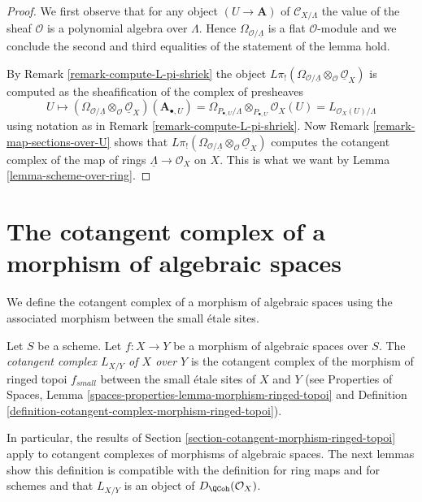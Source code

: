 \begin{proof}
We first observe that for any object $(U \to \mathbf{A})$ of
$\mathcal{C}_{X/\Lambda}$
the value of the sheaf $\mathcal{O}$ is a polynomial algebra over $\Lambda$.
Hence $\Omega_{\mathcal{O}/\underline{\Lambda}}$ is a flat $\mathcal{O}$-module
and we conclude the second and third equalities of the statement of the
lemma hold.

\medskip\noindent
By Remark \ref{remark-compute-L-pi-shriek} the object
$L\pi_!(\Omega_{\mathcal{O}/\underline{\Lambda}}
\otimes_\mathcal{O} \underline{\mathcal{O}}_X)$
is computed as the sheafification of the complex of presheaves
$$
U \mapsto
\left(\Omega_{\mathcal{O}/\underline{\Lambda}}
\otimes_\mathcal{O} \underline{\mathcal{O}}_X\right)(\mathbf{A}_{\bullet, U})
=
\Omega_{P_{\bullet, U}/\Lambda} \otimes_{P_{\bullet, U}} \mathcal{O}_X(U) =
L_{\mathcal{O}_X(U)/\Lambda}
$$
using notation as in Remark \ref{remark-compute-L-pi-shriek}.
Now Remark \ref{remark-map-sections-over-U} shows that
$L\pi_!(\Omega_{\mathcal{O}/\underline{\Lambda}}
\otimes_\mathcal{O} \underline{\mathcal{O}}_X)$
computes the cotangent complex of the map of rings
$\underline{\Lambda} \to \mathcal{O}_X$ on $X$.
This is what we want by Lemma \ref{lemma-scheme-over-ring}.
\end{proof}








\section{The cotangent complex of a morphism of algebraic spaces}
\label{section-cotangent-morphism-spaces}

\noindent
We define the cotangent complex of a morphism of algebraic spaces
using the associated morphism between the small \'etale sites.

\begin{definition}
\label{definition-cotangent-morphism-spaces}
Let $S$ be a scheme. Let $f : X \to Y$ be a morphism of algebraic spaces
over $S$. The {\it cotangent complex $L_{X/Y}$ of $X$ over $Y$} is the
cotangent complex of the morphism of ringed topoi $f_{small}$
between the small \'etale sites of $X$ and $Y$
(see
Properties of Spaces, Lemma
\ref{spaces-properties-lemma-morphism-ringed-topoi}
and
Definition \ref{definition-cotangent-complex-morphism-ringed-topoi}).
\end{definition}

\noindent
In particular, the results of
Section \ref{section-cotangent-morphism-ringed-topoi} apply
to cotangent complexes of morphisms of algebraic spaces.
The next lemmas show this definition is compatible with the definition
for ring maps and for schemes and that $L_{X/Y}$ is an
object of $D_\QCoh(\mathcal{O}_X)$.

